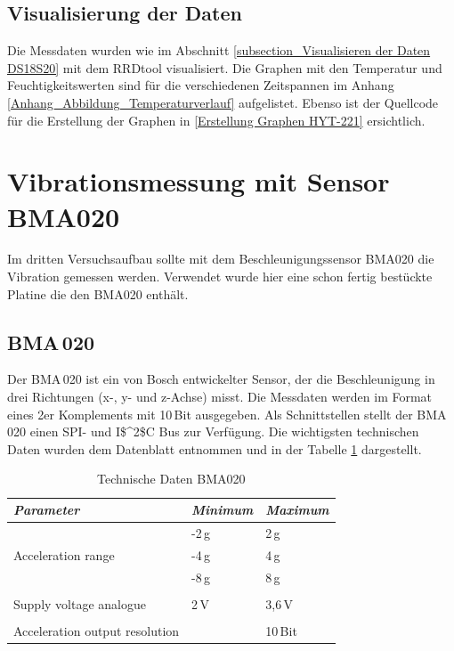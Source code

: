 \subsection{Visualisierung der Daten}
\label{subsection_Visualisierung der Daten}
Die Messdaten wurden wie im Abschnitt \ref{subsection_Visualisieren der Daten DS18S20} mit dem RRDtool visualisiert. Die Graphen mit den Temperatur und Feuchtigkeitswerten sind für die verschiedenen Zeitspannen im Anhang \ref{Anhang_Abbildung_Temperaturverlauf} aufgelistet. Ebenso ist der Quellcode für die Erstellung der Graphen in \ref{Erstellung Graphen HYT-221}  ersichtlich.\newpage


\section{Vibrationsmessung mit Sensor BMA020}
\label{section_BMA020}
Im dritten Versuchsaufbau sollte mit dem Beschleunigungssensor BMA020 die Vibration gemessen werden. Verwendet wurde hier eine schon fertig bestückte Platine die den BMA020 enthält.

\subsection{BMA\,020}
\label{subsection_BMA020}
Der BMA\,020 ist ein von Bosch entwickelter Sensor, der die Beschleunigung in drei Richtungen (x-, y- und z-Achse) misst. Die Messdaten werden im Format eines 2er Komplements mit 10\,Bit ausgegeben. Als Schnittstellen stellt der BMA\,020 einen SPI- und \ac{I$^2$C} Bus zur Verfügung. Die wichtigsten technischen Daten wurden dem Datenblatt \citep{Datenblatt_BMA020} entnommen und in der Tabelle \ref{Tabelle_Technische_Daten_BMA020} dargestellt.  

\begin{table}[H]
\centering
\begin{tabular}{
lll
}
\toprule

\multicolumn{1}{p{5.5cm}}{\textit{Parameter}} & \multicolumn{1}{p{3cm}}{\textit{Minimum} }&\multicolumn{1}{p{3cm}}{\textit{Maximum}}\\\midrule
&-2\,g & 2\,g\\
Acceleration range & -4\,g & 4\,g\\
&-8\,g & 8\,g\\
&&\\
Supply voltage analogue & 2\,V & 3,6\,V\\
&&\\
Acceleration output resolution &&10\,Bit\\
\bottomrule
\end{tabular}
\caption{Technische Daten BMA020 \citep{Datenblatt_BMA020}}
\label{Tabelle_Technische_Daten_BMA020}
\end{table}

